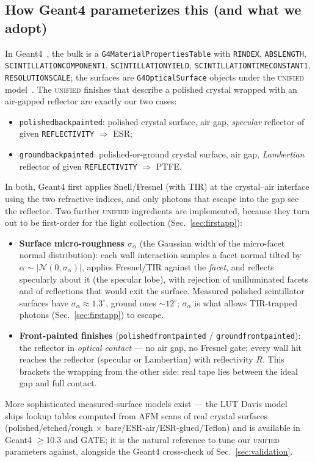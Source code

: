 \documentclass[11pt,a4paper]{article}
\begin{document}
\subsection{How Geant4 parameterizes this (and what we adopt)}
\label{sec:geant4}

In Geant4~\cite{geant4book}, the bulk is a \texttt{G4MaterialPropertiesTable} with
\texttt{RINDEX}, \texttt{ABSLENGTH}, \texttt{SCINTILLATIONCOMPONENT1},
\texttt{SCINTILLATIONYIELD}, \texttt{SCINTILLATIONTIMECONSTANT1},
\texttt{RESOLUTIONSCALE}; the surfaces are \texttt{G4OpticalSurface} objects under the
\textsc{unified} model~\cite{unified}. The \textsc{unified} finishes that describe a polished
crystal wrapped with an air-gapped reflector are exactly our two cases:
\begin{itemize}
  \item \texttt{polishedbackpainted}: polished crystal surface, air gap, \emph{specular}
    reflector of given \texttt{REFLECTIVITY} $\Rightarrow$ ESR;
  \item \texttt{groundbackpainted}: polished-or-ground crystal surface, air gap,
    \emph{Lambertian} reflector of given \texttt{REFLECTIVITY} $\Rightarrow$ PTFE.
\end{itemize}
In both, Geant4 first applies Snell/Fresnel (with TIR) at the crystal--air interface using
the two refractive indices, and only photons that escape into the gap see the reflector.
Two further \textsc{unified} ingredients are implemented, because they turn out to be
first-order for the light collection (Sec.~\ref{sec:firstapp}):
\begin{itemize}
  \item \textbf{Surface micro-roughness $\sigma_\alpha$} (the Gaussian width of the
    micro-facet normal distribution): each wall interaction samples a facet normal tilted
    by $\alpha \sim |\mathcal{N}(0,\sigma_\alpha)|$, applies Fresnel/TIR against the
    \emph{facet}, and reflects specularly about it (the specular lobe), with rejection of
    unilluminated facets and of reflections that would exit the surface. Measured polished
    scintillator surfaces have $\sigma_\alpha \approx 1.3^\circ$, ground ones
    $\sim 12^\circ$; $\sigma_\alpha$ is what allows TIR-trapped photons
    (Sec.~\ref{sec:firstapp}) to escape.
  \item \textbf{Front-painted finishes} (\texttt{polishedfrontpainted} /
    \texttt{groundfrontpainted}): the reflector in \emph{optical contact} --- no air gap,
    no Fresnel gate; every wall hit reaches the reflector (specular or Lambertian) with
    reflectivity $R$. This brackets the wrapping from the other side: real tape lies
    between the ideal gap and full contact.
\end{itemize}
More sophisticated measured-surface models exist --- the LUT Davis model~\cite{lutdavis}
ships lookup tables computed from AFM scans of real crystal surfaces (polished/etched/rough
$\times$ bare/ESR-air/ESR-glued/Teflon) and is available in Geant4 $\ge$10.3 and GATE; it is
the natural reference to tune our \textsc{unified} parameters against, alongside the Geant4
cross-check of Sec.~\ref{sec:validation}.
\end{document}
